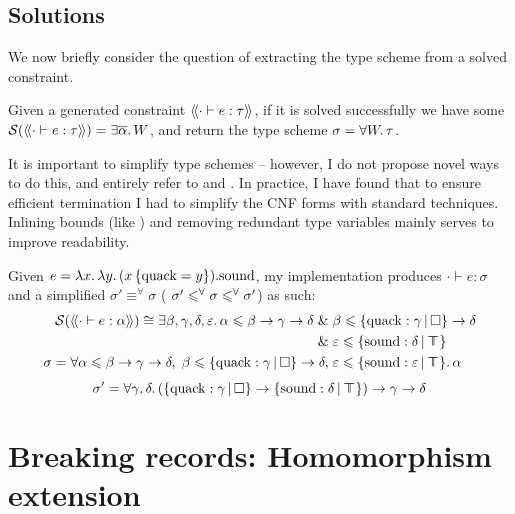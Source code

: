 \subsection{Solutions}
\label{subsec:simplification}

We now briefly consider the question of extracting the type scheme from a solved constraint. 

Given a generated constraint $\cstr{\cdot}{e}{\tau}$, if it is solved successfully we have some $\mathcal S \left( \cstr{\cdot}{e}{\tau} \right) = \exists \overline{\alpha} \ldotp \sbnd$, and return the type scheme $\sigma =  \forall W \ldotp \tau$.

It is important to simplify type schemes -- however, I do not propose novel ways to do this, and entirely refer to \textcite{simple-sub} and \textcite{mlstruct}. In practice, I have found that to ensure efficient termination I had to simplify the CNF forms with standard techniques. Inlining bounds (like \textcite{dolan-thesis}) and removing redundant type variables mainly serves to improve readability.

\begin{example}
    Given
    $e = \lambda {x} \ldotp \lambda {y} \ldotp {(x \, \{ \mathrm{quack} = y \})}{.}{\mathrm{sound}}$,
    my implementation produces $\cdot \vdash e : \sigma$ and a simplified $\sigma' \equiv^\forall \sigma$ (\ie{} $\sigma' \leqslant^\forall \sigma \leqslant^\forall \sigma'$) as such:
    \begin{align*}
    \mathcal S(\cstr{\cdot}{e}{\alpha}) \cong \exists \beta, \gamma, \delta, \varepsilon \ldotp \alpha \sub \beta \to \gamma \to \delta \und& \beta \sub \flext{\mathrm{quack}: \gamma}{\flabsent} \to \delta \\ \und& \varepsilon \sub \flext{\mathrm{sound}: \delta}{\flftop} \\
    \sigma = \forall \alpha \sub \beta \to \gamma \to \delta,\; \beta \sub \flext{\mathrm{quack}: \gamma}{\flabsent} \to \delta,\;& \varepsilon \sub \flext{\mathrm{sound}: \varepsilon}{\flftop} \ldotp \alpha
    \end{align*}    
    $$ \sigma' = \forall \gamma, \delta \ldotp (\flext{\mathrm{quack}: \gamma}{\flabsent} \to \flext{\mathrm{sound} : \delta}{\flftop}) \to \gamma \to \delta $$
\end{example}

\section{Breaking records: Homomorphism extension}
\label{sec:morphisms}

